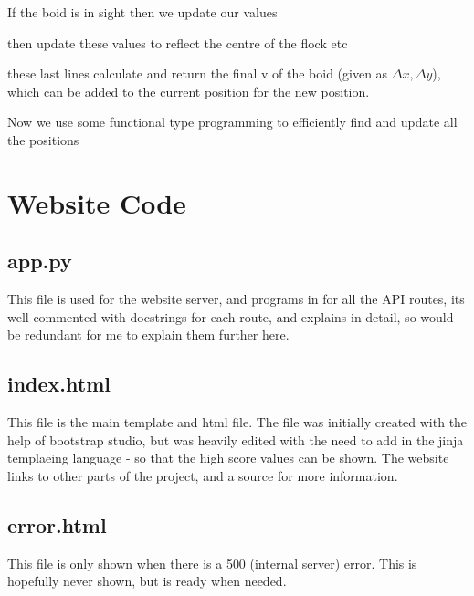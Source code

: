 If the boid is in sight then we update our values


then update these values to reflect the centre of the flock etc


these last lines calculate and return the final v of the boid (given as $\Delta x, \Delta y$), which can be added to the current position for the new position.


Now we use some functional type programming to efficiently find and update all the positions




\lstlistoflistings

\section{Website Code}

\subsection{app.py}
This file is used for the website server, and programs in for all the API routes, its well commented with docstrings for each route, and explains in detail, so would be redundant for me to explain them further here.


\subsection{index.html}
This file is the main template and html file. The file was initially created with the help of bootstrap studio, but was heavily edited with the need to add in the jinja templaeing language - so that the high score values can be shown. The website links to other parts of the project, and a source for more information. 


\subsection{error.html}
This file is only shown when there is a 500 (internal server) error. This is hopefully never shown, but is ready when needed.


